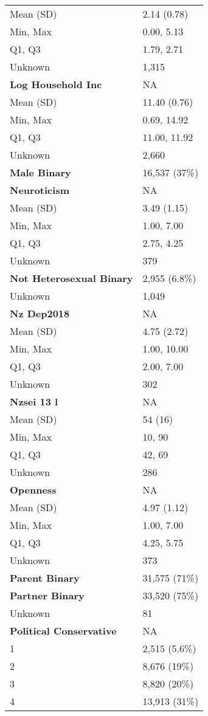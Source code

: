 \documentclass[
  single column]{article}
\begin{document}
\begin{longtable}[]{@{}ll@{}}
Mean (SD) & 2.14 (0.78) \\
Min, Max & 0.00, 5.13 \\
Q1, Q3 & 1.79, 2.71 \\
Unknown & 1,315 \\
\textbf{Log Household Inc} & NA \\
Mean (SD) & 11.40 (0.76) \\
Min, Max & 0.69, 14.92 \\
Q1, Q3 & 11.00, 11.92 \\
Unknown & 2,660 \\
\textbf{Male Binary} & 16,537 (37\%) \\
\textbf{Neuroticism} & NA \\
Mean (SD) & 3.49 (1.15) \\
Min, Max & 1.00, 7.00 \\
Q1, Q3 & 2.75, 4.25 \\
Unknown & 379 \\
\textbf{Not Heterosexual Binary} & 2,955 (6.8\%) \\
Unknown & 1,049 \\
\textbf{Nz Dep2018} & NA \\
Mean (SD) & 4.75 (2.72) \\
Min, Max & 1.00, 10.00 \\
Q1, Q3 & 2.00, 7.00 \\
Unknown & 302 \\
\textbf{Nzsei 13 l} & NA \\
Mean (SD) & 54 (16) \\
Min, Max & 10, 90 \\
Q1, Q3 & 42, 69 \\
Unknown & 286 \\
\textbf{Openness} & NA \\
Mean (SD) & 4.97 (1.12) \\
Min, Max & 1.00, 7.00 \\
Q1, Q3 & 4.25, 5.75 \\
Unknown & 373 \\
\textbf{Parent Binary} & 31,575 (71\%) \\
\textbf{Partner Binary} & 33,520 (75\%) \\
Unknown & 81 \\
\textbf{Political Conservative} & NA \\
1 & 2,515 (5.6\%) \\
2 & 8,676 (19\%) \\
3 & 8,820 (20\%) \\
4 & 13,913 (31\%) \\

\end{longtable}
\end{document}
